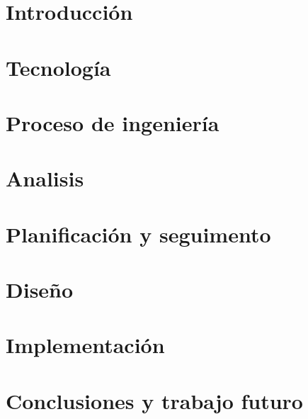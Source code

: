 \documentclass[11pt,a4paper,titlepage,twoside,openright]{report}
\begin{document}
\makeatletter
\def\cleardoublepage{\clearpage\if@twoside \ifodd\c@page\else
  \hbox{}\thispagestyle{empty}\newpage\if@twocolumn\hbox{}\newpage\fi\fi\fi}
\makeatother

\tableofcontents


\chapter{Introducción}
        \label{intro}
        
        \cleardoublepage



\chapter{Tecnología}
        \label{tec}
        
        \cleardoublepage

\chapter{Proceso de ingeniería}
		
		\cleardoublepage

\chapter{Analisis}
		
		\cleardoublepage


\chapter{Planificación y seguimento}




\chapter{Diseño}
		
 		


\chapter{Implementación}
		


\chapter{Conclusiones y trabajo futuro}
        
        
\end{document}
